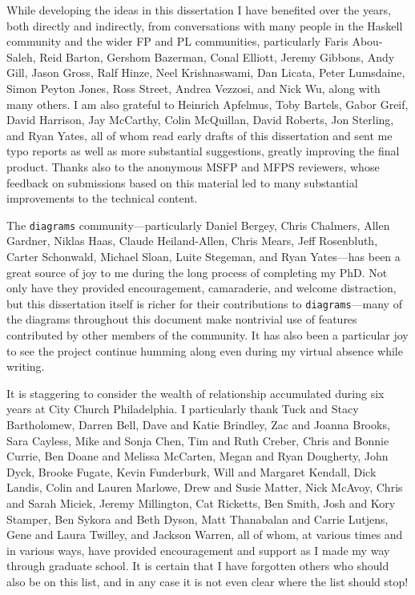 While developing the ideas in this dissertation I have benefited over
the years, both directly and indirectly, from conversations with many
people in the Haskell community and the wider FP and PL communities,
particularly Faris Abou-Saleh, Reid Barton, Gershom Bazerman, Conal
Elliott, Jeremy Gibbons, Andy Gill, Jason Gross, Ralf Hinze, Neel
Krishnaswami, Dan Licata, Peter Lumsdaine, Simon Peyton Jones, Ross
Street, Andrea Vezzosi, and Nick Wu, along with many others.  I am
also grateful to Heinrich Apfelmus, Toby Bartels, Gabor Greif, David Harrison,
Jay McCarthy, Colin McQuillan, David Roberts, Jon Sterling, and Ryan
Yates, all of whom read early drafts of this dissertation and sent me
typo reports as well as more substantial suggestions, greatly
improving the final product.  Thanks also to the anonymous MSFP and
MFPS reviewers, whose feedback on submissions based on this material
led to many substantial improvements to the technical content.

The \texttt{diagrams} community---particularly Daniel Bergey, Chris
Chalmers, Allen Gardner, Niklas Haas, Claude Heiland-Allen, Chris
Mears, Jeff Rosenbluth, Carter Schonwald, Michael Sloan, Luite
Stegeman, and Ryan Yates---has been a great source of joy to me during
the long process of completing my PhD.  Not only have they provided
encouragement, camaraderie, and welcome distraction, but this
dissertation itself is richer for their contributions to
\texttt{diagrams}---many of the diagrams throughout this document make
nontrivial use of features contributed by other members of the
community.  It has also been a particular joy to see the project
continue humming along even during my virtual absence while writing.

It is staggering to consider the wealth of relationship accumulated
during six years at City Church Philadelphia.  I particularly thank
Tuck and Stacy Bartholomew, Darren Bell, Dave and Katie Brindley, Zac
and Joanna Brooks, Sara Cayless, Mike and Sonja Chen, Tim and Ruth
Creber, Chris and Bonnie Currie, Ben Doane and Melissa McCarten, Megan and Ryan Dougherty, John
Dyck, Brooke Fugate, Kevin Funderburk, Will and Margaret Kendall, Dick Landis, Colin and Lauren
Marlowe, Drew and Susie Matter, Nick McAvoy, Chris and Sarah Miciek,
Jeremy Millington, Cat Ricketts, Ben Smith, Josh and Kory Stamper, Ben
Sykora and Beth Dyson, Matt Thanabalan and Carrie Lutjens, Gene and
Laura Twilley, and Jackson Warren, all of whom, at various times and
in various ways, have provided encouragement and support as I made my
way through graduate school. It is certain that I have forgotten
others who should also be on this list, and in any case it is not even
clear where the list should stop!

